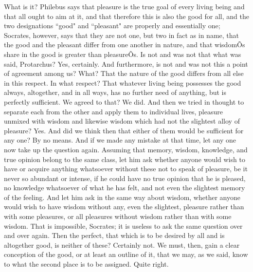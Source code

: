 \documentclass[letterpaper,12pt]{article}
\newcommand{\stephpag}[1]{\marginnote{\small\itshape\fontfamily{ppl}\selectfont #1}}
\begin{document}
\begin{drama}
\protarchusspeaks
What is it?
\socratesspeaks
Philebus says that pleasure is the true goal of every living being and that all ought to aim at it, and that therefore this is also the good for all, and the two designations ``good" and ``pleasant" are properly and essentially one; Socrates, however, says that they are not one, \stephpag{b} but two in fact as in name, that the good and the pleasant differ from one another in nature, and that wisdomÕs share in the good is greater than pleasureÕs. Is not and was not that what was said, Protarchus?
\protarchusspeaks
Yes, certainly.
\socratesspeaks
And furthermore, is not and was not this a point of agreement among us?
\protarchusspeaks
What?
\socratesspeaks
That the nature of the good differs from all else in this respect. \stephpag{c}
\protarchusspeaks
In what respect?
\socratesspeaks
That whatever living being possesses the good always, altogether, and in all ways, has no further need of anything, but is perfectly sufficient. We agreed to that?
\protarchusspeaks
We did.
\socratesspeaks
And then we tried in thought to separate each from the other and apply them to individual lives, pleasure unmixed with wisdom and likewise wisdom which had not the slightest alloy of pleasure?
\protarchusspeaks
Yes. \stephpag{d}
\socratesspeaks
And did we think then that either of them would be sufficient for any one?
\protarchusspeaks
By no means.
\socratesspeaks
And if we made any mistake at that time, let any one now take up the question again. Assuming that memory, wisdom, knowledge, and true opinion belong to the same class, let him ask whether anyone would wish to have or acquire anything whatsoever without these not to speak of pleasure, be it never so abundant or intense, if he could have no true opinion that he is pleased, no knowledge whatsoever \stephpag{e} of what he has felt, and not even the slightest memory of the feeling. And let him ask in the same way about wisdom, whether anyone would wish to have wisdom without any, even the slightest, pleasure rather than with some pleasures, or all pleasures without wisdom rather than with some wisdom.
\protarchusspeaks
That is impossible, Socrates; it is useless to ask the same question over and over again. \stephpag{61 a}
\socratesspeaks
Then the perfect, that which is to be desired by all and is altogether good, is neither of these?
\protarchusspeaks
Certainly not.
\socratesspeaks
We must, then, gain a clear conception of the good, or at least an outline of it, that we may, as we said, know to what the second place is to be assigned.
\protarchusspeaks
Quite right.
\socratesspeaks

\end{drama}
\end{document}
